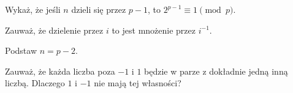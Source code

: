 
\begin{hints_list}
	\item Wykaż, że jeśli $n$ dzieli się przez $p - 1$, to $2^{p - 1} \equiv 1 \pmod{p}$. 
	\item Zauważ, że dzielenie przez $i$ to jest mnożenie przez $i^{-1}$.
	\item Podstaw $n = p - 2$.
	\item Zauważ, że każda liczba poza $-1$ i $1$ będzie w parze z dokładnie jedną inną liczbą. Dlaczego $1$ i $-1$ nie mają tej własności?
\end{hints_list}